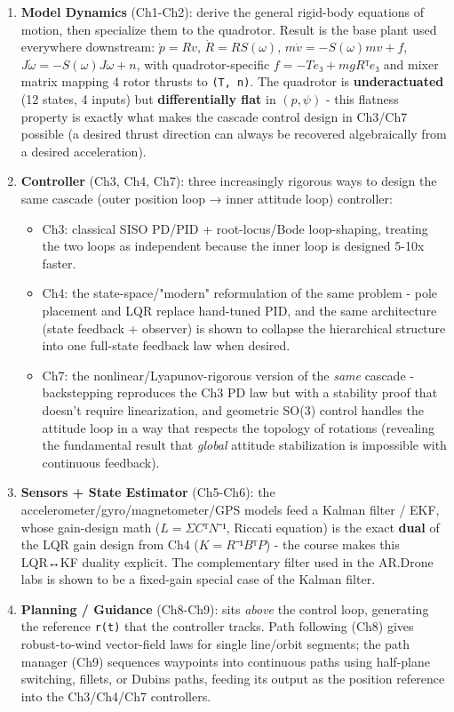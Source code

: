 \documentclass[11pt]{article}
\begin{document}
\begin{enumerate}
\item \textbf{Model Dynamics} (Ch1-Ch2): derive the general rigid-body equations of motion, then specialize them to the quadrotor. Result is the base plant used everywhere downstream:
$\dot{p} = Rv$, $\dot{R} = RS(ω)$, $m\dot{v} = -S(ω)mv + f$, $J\dot{ω} = -S(ω)Jω + n$, with quadrotor-specific $f = -Te₃ + mgRᵀe₃$ and mixer matrix mapping 4 rotor thrusts to \texttt{(T, n)}. The quadrotor is \textbf{underactuated} (12 states, 4 inputs) but \textbf{differentially flat} in $(p, ψ)$ - this flatness property is exactly what makes the cascade control design in Ch3/Ch7 possible (a desired thrust direction can always be recovered algebraically from a desired acceleration).
\item \textbf{Controller} (Ch3, Ch4, Ch7): three increasingly rigorous ways to design the same cascade (outer position loop → inner attitude loop) controller:
\begin{itemize}
\item Ch3: classical SISO PD/PID + root-locus/Bode loop-shaping, treating the two loops as independent because the inner loop is designed 5-10x faster.
\item Ch4: the state-space/"modern" reformulation of the same problem - pole placement and LQR replace hand-tuned PID, and the same architecture (state feedback + observer) is shown to collapse the hierarchical structure into one full-state feedback law when desired.
\item Ch7: the nonlinear/Lyapunov-rigorous version of the \textit{same} cascade - backstepping reproduces the Ch3 PD law but with a stability proof that doesn't require linearization, and geometric SO(3) control handles the attitude loop in a way that respects the topology of rotations (revealing the fundamental result that \textit{global} attitude stabilization is impossible with continuous feedback).
\end{itemize}
\item \textbf{Sensors + State Estimator} (Ch5-Ch6): the accelerometer/gyro/magnetometer/GPS models feed a Kalman filter / EKF, whose gain-design math ($L = ΣCᵀN⁻¹$, Riccati equation) is the exact \textbf{dual} of the LQR gain design from Ch4 ($K = R⁻¹BᵀP$) - the course makes this LQR↔KF duality explicit. The complementary filter used in the AR.Drone labs is shown to be a fixed-gain special case of the Kalman filter.
\item \textbf{Planning / Guidance} (Ch8-Ch9): sits \textit{above} the control loop, generating the reference \texttt{r(t)} that the controller tracks. Path following (Ch8) gives robust-to-wind vector-field laws for single line/orbit segments; the path manager (Ch9) sequences waypoints into continuous paths using half-plane switching, fillets, or Dubins paths, feeding its output as the position reference into the Ch3/Ch4/Ch7 controllers.
\end{enumerate}
\end{document}
